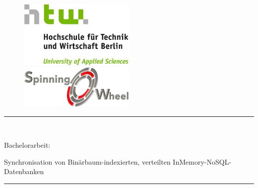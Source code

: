 \documentclass[a4paper,11pt,oneside,%
headsepline,												%
footsepline,												%
bibtotocnumbered									%
]{scrreprt}
\newcommand{\HRule}{\rule{\linewidth}{0.5mm}}
\begin{document}
\begin{titlepage}
	\begin{center}
		\begin{figure}[!htb]
				\begin{center}
			  		\includegraphics[width=0.5\textwidth]{bilder/htwLogo.jpeg}
				\end{center}
			\endminipage\hfill
				\begin{center}
			 		\includegraphics[width=0.5\textwidth]{bilder/Spinning_O_Wheel-200.png}
				\end{center}	
			\endminipage
		\end{figure}
	
		 \vfill
		 \HRule \\[0.4cm]
	    {\bfseries\Large
	        \begin{LARGE}
	        Bachelorarbeit:\\
	        \end{LARGE} 
	        Synchronisation von Binärbaum-indexierten, verteilten
			InMemory-NoSQL-Datenbanken\\
	    }    
		\HRule \\[1.5cm]
	 	\vfill
	

\end{center}
\end{titlepage}
\end{document}
